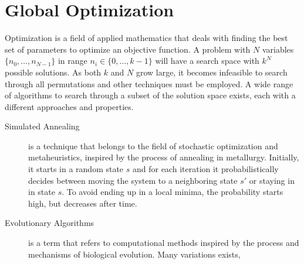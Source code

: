 \section{Global Optimization}

Optimization is a field of applied mathematics that deals with finding the
best set of parameters to optimize an objective function. A problem with
$N$ variables $\{n_0, \dots, n_{N-1}\}$ in range $n_i \in \{0, \dots, k-1\}$ will have a
search space with $k^N$ possible solutions. As both $k$ and $N$ grow large, it
becomes infeasible to search through all permutations and other techniques must
be employed. A wide range of algorithms to search through a subset of the
solution space exists, each with a different approaches and properties.

\begin{description}
    \item[Simulated Annealing] is a technique that belongs to the field of
        stochastic optimization and metaheuristics, inspired by the process of
        annealing in metallurgy. Initially, it starts in a random state $s$ and
        for each iteration it probabilistically decides between moving the
        system to a neighboring state $s'$ or staying in in state $s$. To avoid
        ending up in a local minima, the probability starts high, but decreases
        after time.
    \item[Evolutionary Algorithms] is a term that refers to computational
        methods inspired by the process and mechanisms of biological evolution.         Many variations exists, 

\end{description}

